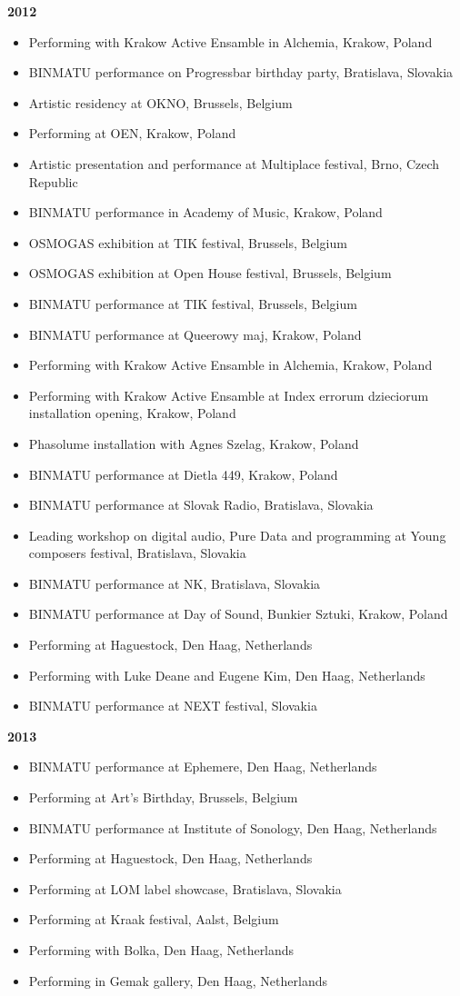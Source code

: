 \textbf{2012}
\begin{itemize}
\item Performing with Krakow Active Ensamble in Alchemia, Krakow, Poland
\item BINMATU performance on Progressbar birthday party, Bratislava, Slovakia
\item Artistic residency at OKNO, Brussels, Belgium
\item Performing at OEN, Krakow, Poland
\item Artistic presentation and performance at Multiplace festival, Brno, Czech Republic
\item BINMATU performance in Academy of Music, Krakow, Poland
\item OSMOGAS exhibition at TIK festival, Brussels, Belgium
\item OSMOGAS exhibition at Open House festival, Brussels, Belgium
\item BINMATU performance at TIK festival, Brussels, Belgium
\item BINMATU performance at Queerowy maj, Krakow, Poland
\item Performing with Krakow Active Ensamble in Alchemia, Krakow, Poland
\item Performing with Krakow Active Ensamble at Index errorum dzieciorum installation opening, Krakow, Poland
\item Phasolume installation with Agnes Szelag, Krakow, Poland
\item BINMATU performance at Dietla 449, Krakow, Poland
\item BINMATU performance at Slovak Radio, Bratislava, Slovakia
\item Leading workshop on digital audio, Pure Data and programming at Young composers festival, Bratislava, Slovakia
\item BINMATU performance at NK, Bratislava, Slovakia
\item BINMATU performance at Day of Sound, Bunkier Sztuki, Krakow, Poland
\item Performing at Haguestock, Den Haag, Netherlands
\item Performing with Luke Deane and Eugene Kim, Den Haag, Netherlands
\item BINMATU performance at NEXT festival, Slovakia
\end{itemize}
\vspace{1cm}

\textbf{2013}
\begin{itemize}
\item BINMATU performance at Ephemere, Den Haag, Netherlands
\item Performing at Art's Birthday, Brussels, Belgium
\item BINMATU performance at Institute of Sonology, Den Haag, Netherlands
\item Performing at Haguestock, Den Haag, Netherlands
\item Performing at LOM label showcase, Bratislava, Slovakia
\item Performing at Kraak festival, Aalst, Belgium
\item Performing with Bolka, Den Haag, Netherlands
\item Performing in Gemak gallery, Den Haag, Netherlands
\end{itemize}
